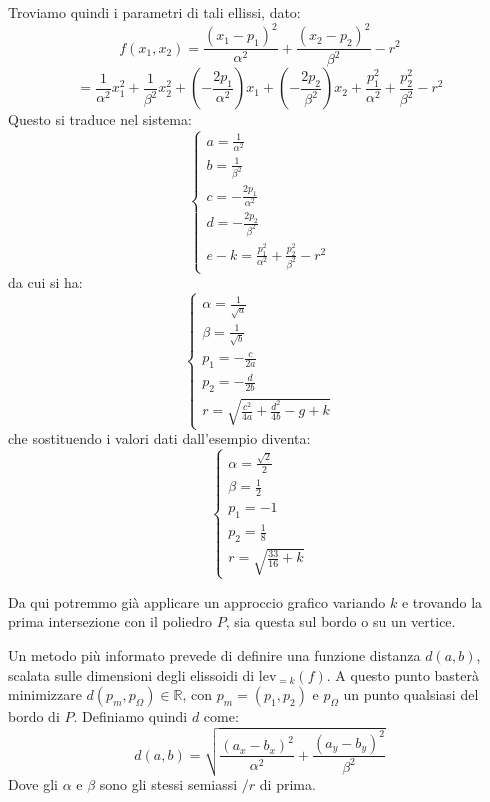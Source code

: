 \documentclass[a4paper,11pt]{article}
\begin{document}
\begin{itemize}
\begin{enumerate}
				Troviamo quindi i parametri di tali ellissi, dato:
				$$
				f(x_1, x_2)	= \frac{(x_1 - p_1)^2}{\alpha^2} + \frac{(x_2 - p_2)^2}{\beta^2} - r^2
				$$
				$$
				= \frac{1}{\alpha^2} x_1^2 + \frac{1}{\beta^2} x_2^2 + \left( -\frac{2 p_1}{\alpha^2} \right) x_1 + \left( -\frac{2 p_2}{\beta^2} \right) x_2 + \frac{p_1^2}{\alpha^2} + \frac{p_2^2}{\beta^2} - r^2
				$$
				Questo si traduce nel sistema:
				\[
					\begin{cases}
						a = \frac{1}{\alpha^2} \\ 	
						b = \frac{1}{\beta^2} \\ 	
						c = - \frac{2 p_1}{\alpha^2} \\ 	
						d = - \frac{2 p_2}{\beta^2} \\ 
						e - k = \frac{p_1^2}{\alpha^2} + \frac{p_2^2}{\beta^2} - r^2
					\end{cases}
				\]
				da cui si ha:
				\[
					\begin{cases}
						\alpha = \frac{1}{\sqrt{a}} \\ 	
						\beta = \frac{1}{\sqrt{b}} \\
						p_1 = - \frac{c}{2a} \\
						p_2 = - \frac{d}{2b} \\
						r = \sqrt{\frac{c^{2}}{4a}+\frac{d^{2}}{4b}-g+k}
					\end{cases}
				\]
				che sostituendo i valori dati dall'esempio diventa:
				\[
					\begin{cases}
						\alpha = \frac{\sqrt{2}}{2} \\ 
						\beta = \frac{1}{2} \\ 
						p_1 = -1 \\ 
						p_2 = \frac{1}{8} \\
						r = \sqrt{\frac{33}{16} + k}
					\end{cases}
				\]
				
				Da qui potremmo già applicare un approccio grafico variando $k$ e trovando la prima intersezione con il poliedro $P$, sia questa sul bordo o su un vertice.
				
				Un metodo più informato prevede di definire una funzione distanza $d(a, b)$, scalata sulle dimensioni degli elissoidi di $\mathrm{lev}_{=k}(f)$.
				A questo punto basterà minimizzare $d(p_m, p_\Omega) \in \mathbb{R}$, con $p_m = (p_1, p_2)$ e $p_\Omega$ un punto qualsiasi del bordo di $P$.
				Definiamo quindi $d$ come:
				$$
				d(a, b) = \sqrt{\frac{(a_x - b_x)^2}{\alpha^2} + \frac{(a_y - b_y)^2}{\beta^2}}
				$$
				Dove gli $\alpha$ e $\beta$ sono gli stessi semiassi $/ r$ di prima.
				

\end{enumerate}
\end{itemize}
\end{document}
